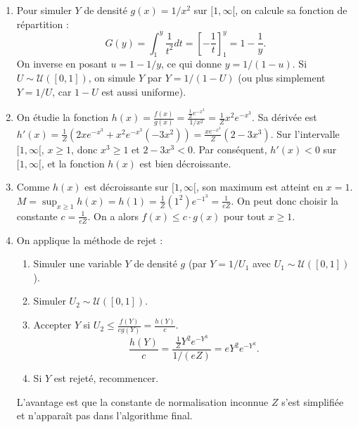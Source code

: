 \documentclass[solutions]{exercices}
\begin{document}
\begin{solution}
\begin{enumerate}
    \item Pour simuler $Y$ de densité $g(x)=1/x^2$ sur $[1, \infty[$, on calcule sa fonction de répartition :
    \[ G(y) = \int_1^y \frac{1}{t^2} dt = [-\frac{1}{t}]_1^y = 1 - \frac{1}{y}. \]
    On inverse en posant $u = 1 - 1/y$, ce qui donne $y = 1/(1-u)$.
    Si $U \sim \mathcal{U}([0,1])$, on simule $Y$ par $Y = 1/(1-U)$ (ou plus simplement $Y=1/U$, car $1-U$ est aussi uniforme).
    \item On étudie la fonction $h(x) = \frac{f(x)}{g(x)} = \frac{\frac{1}{Z}e^{-x^3}}{1/x^2} = \frac{1}{Z}x^2 e^{-x^3}$.
    Sa dérivée est $h'(x) = \frac{1}{Z} (2x e^{-x^3} + x^2 e^{-x^3}(-3x^2)) = \frac{x e^{-x^3}}{Z}(2-3x^3)$.
    Sur l'intervalle $[1, \infty[$, $x \ge 1$, donc $x^3 \ge 1$ et $2-3x^3 < 0$.
    Par conséquent, $h'(x) < 0$ sur $[1, \infty[$, et la fonction $h(x)$ est bien décroissante.
    \item Comme $h(x)$ est décroissante sur $[1, \infty[$, son maximum est atteint en $x=1$.
    $M = \sup_{x\ge 1} h(x) = h(1) = \frac{1}{Z} (1^2) e^{-1^3} = \frac{1}{eZ}$.
    On peut donc choisir la constante $c = \frac{1}{eZ}$. On a alors $f(x) \le c \cdot g(x)$ pour tout $x \ge 1$.
    \item On applique la méthode de rejet :
    \begin{enumerate}
        \item Simuler une variable $Y$ de densité $g$ (par $Y=1/U_1$ avec $U_1 \sim \mathcal{U}([0,1])$).
        \item Simuler $U_2 \sim \mathcal{U}([0,1])$.
        \item Accepter $Y$ si $U_2 \le \frac{f(Y)}{c g(Y)} = \frac{h(Y)}{c}$.
        \[ \frac{h(Y)}{c} = \frac{\frac{1}{Z}Y^2 e^{-Y^3}}{1/(eZ)} = e Y^2 e^{-Y^3}. \]
        \item Si $Y$ est rejeté, recommencer.
    \end{enumerate}
    L'avantage est que la constante de normalisation inconnue $Z$ s'est simplifiée et n'apparaît pas dans l'algorithme final.
\end{enumerate}
\end{solution}
\end{document}
